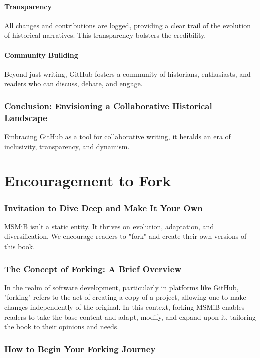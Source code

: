 \documentclass{book}
\begin{document}
\subsubsection*{Transparency}
All changes and contributions are logged, providing a clear trail of the evolution of historical narratives. This transparency bolsters the credibility.

\subsubsection*{Community Building}
Beyond just writing, GitHub fosters a community of historians, enthusiasts, and readers who can discuss, debate, and engage.

\subsection*{Conclusion: Envisioning a Collaborative Historical Landscape}
Embracing GitHub as a tool for collaborative writing, it heralds an era of inclusivity, transparency, and dynamism. 

\chapter{Encouragement to Fork}
\subsection*{Invitation to Dive Deep and Make It Your Own}
MSMiB isn't a static entity. It thrives on evolution, adaptation, and diversification. We encourage readers to "fork" and create their own versions of this book. 

\subsection*{The Concept of Forking: A Brief Overview}

In the realm of software development, particularly in platforms like GitHub, "forking" refers to the act of creating a copy of a project, allowing one to make changes independently of the original. In this context, forking MSMiB enables readers to take the base content and adapt, modify, and expand upon it, tailoring the book to their opinions and needs.

\subsection*{How to Begin Your Forking Journey}
\end{document}
